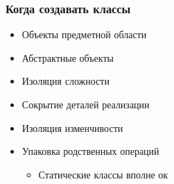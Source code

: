 \documentclass[xetex,mathserif,serif]{beamer}
\begin{document}
	\begin{frame}
		\frametitle{Когда создавать классы}
		\begin{itemize}
			\item Объекты предметной области
			\item Абстрактные объекты
			\item Изоляция сложности
			\item Сокрытие деталей реализации
			\item Изоляция изменчивости
			\item Упаковка родственных операций
			\begin{itemize}
				\item Статические классы вполне ок
			\end{itemize}
		\end{itemize}
	\end{frame}
\end{document}
